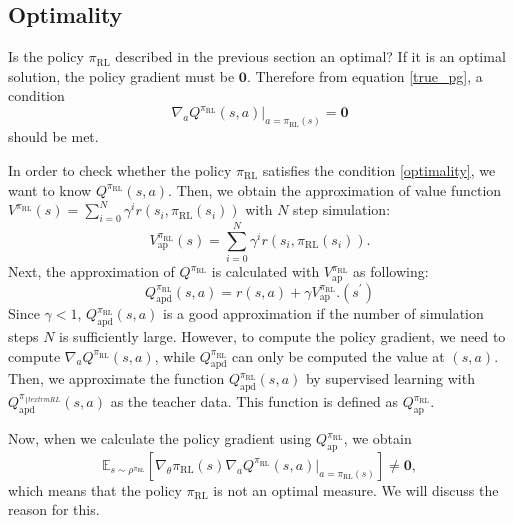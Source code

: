 \documentclass[english, dvipdfmx]{ampmt}             %
\newcommand{\expect}{\mathbb{E}}
\begin{document}
\subsection{Optimality}
Is the policy $\pi_{\textrm{RL}}$ described in the previous section an optimal? If it is an optimal solution, the policy gradient must be $\bm{0}$. Therefore from equation \eqref{true_pg}, a condition
\begin{equation}
	\nabla_a Q^{\pi_{\textrm{RL}}}(s,a)|_{a=\pi_{\textrm{RL}}(s)} = \bm{0}
\end{equation}
should be met. \par
In order to check whether the policy $\pi_{\textrm{RL}}$ satisfies the condition \eqref{optimality}, we want to know $Q^{\pi_{\textrm{RL}}}(s,a)$. Then, we obtain the approximation of value function $V^{\pi_{\textrm{RL}}}(s) = \sum_{i=0}^{N}\gamma^i r(s_i,\pi_{\textrm{RL}}(s_i))$ with $N$ step simulation:
\begin{equation}
	V^{\pi_{\textrm{RL}}}_{\textrm{ap}}(s) = \sum_{i=0}^{N}\gamma^i r(s_i,\pi_{\textrm{RL}}(s_i)).
\end{equation}
Next, the approximation of $Q^{\pi_{\textrm{RL}}}$ is calculated with $V^{\pi_{\textrm{RL}}}_{\textrm{ap}}$ as following:
\begin{equation}
	Q^{\pi_{\textrm{RL}}}_{\textrm{apd}}(s,a) = r(s,a) + \gamma V^{\pi_{\textrm{RL}}}_{\textrm{ap}}.(s^{\prime})
\end{equation}
Since $\gamma < 1$, $Q^{\pi_{\textrm{RL}}}_{\textrm{apd}}(s,a)$ is a good approximation if the number of simulation steps $N$ is sufficiently large. However, to compute the policy gradient, we need to compute $\nabla_{a}Q^{\pi_{\textrm{RL}}}(s, a)$, while $Q^{\pi_{\textrm{RL}}}_{\textrm{apd}}$ can only be computed the value at $(s,a)$. Then, we approximate the function $Q^{\pi_{\textrm{RL}}}_{\textrm{apd}}(s,a)$ by supervised learning with $Q^{\pi_{\{textrm{RL}}}_{\textrm{apd}}(s,a)$ as the teacher data. This function is defined as $Q^{\pi_{\textrm{RL}}}_{\textrm{ap}}$.\par
Now, when we calculate the policy gradient using $Q^{\pi_{\textrm{RL}}}_{\textrm{ap}}$, we obtain
\begin{equation}
	\expect_{s\sim\rho^{\pi_{\textrm{RL}}}}[
	\nabla_{\theta}\pi_{\textrm{RL}}(s)\nabla_{a}Q^{\pi_{\textrm{RL}}}(s, a)|_{a=\pi_{\textrm{RL}}(s)}] \neq \bm{0}, 
\end{equation}
which means that the policy $\pi_{\textrm{RL}}$ is not an optimal measure. We will discuss the reason for this.
\end{document}
